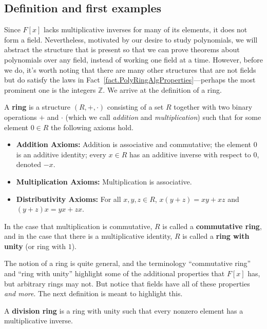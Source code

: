 \subsection{Definition and first examples}

Since $F[x]$ lacks multiplicative inverses for many of its elements, it does not form a field. Nevertheless, motivated by our desire to study polynomials, we will abstract the structure that is present so that we can prove theorems about polynomials over any field, instead of  working one field at a time. However, before we do, it's worth noting that there are many other structures that are not fields but do satisfy the laws in Fact~\ref{fact.PolyRingAlgProperties}---perhaps the most prominent one is the integers $\mathbb{Z}$. We  arrive at the definition of a ring.

\begin{definition}
A \textbf{ring} is a structure $(R,+,\cdot)$ consisting of a set $R$ together with two binary operations $+$ and $\cdot$ (which we call \emph{addition} and \emph{multiplication}) such that for some element $0\in R$ the following axioms hold.
\begin{itemize}
\item \textbf{Addition Axioms:} Addition is associative and commutative; the element $0$ is an additive identity; every  $x\in R$ has an additive inverse with respect to $0$, denoted $-x$.
\item \textbf{Multiplication Axioms:} Multiplication is associative.
\item \textbf{Distributivity Axioms:} For all $x,y,z \in R$, $x(y+z) = xy+xz$ and $(y+z)x = yx+zx$.
\end{itemize}
In the case that multiplication is commutative, $R$ is called a \textbf{commutative ring}, and in the case that there is a multiplicative identity, $R$ is called a \textbf{ring with unity} (or ring with $1$). 
\end{definition}

The notion of a ring is quite general, and the  terminology  ``commutative ring'' and ``ring with unity'' highlight some of the additional properties that $F[x]$ has, but arbitrary rings may not. But notice that fields have all of these properties \emph{and more}. The next definition  is meant to highlight this.

\begin{definition}
A \textbf{division ring} is a ring with unity such that every nonzero element has a multiplicative inverse.
\end{definition}

